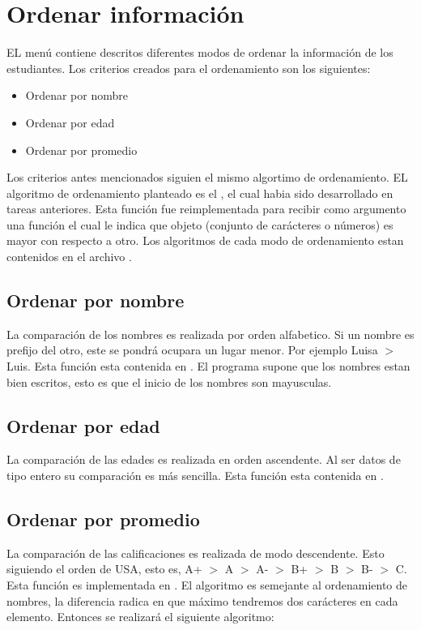 \section{Ordenar información}

EL menú contiene descritos diferentes modos de ordenar la información de los estudiantes. Los criterios creados para el ordenamiento son los siguientes:

\begin{itemize}
    \item Ordenar por nombre
    \item Ordenar por edad
    \item Ordenar por promedio
\end{itemize}

Los criterios antes mencionados siguien el mismo algortimo de ordenamiento. EL algoritmo de ordenamiento planteado es el , el cual habia sido desarrollado en tareas anteriores. Esta función fue reimplementada para recibir como argumento una función el cual le indica que objeto (conjunto de carácteres o números) es mayor con respecto a otro. Los algoritmos de cada modo de ordenamiento estan contenidos en el archivo .

\subsection{Ordenar por nombre}

La comparación de los nombres es realizada por orden alfabetico. Si un nombre es prefijo del otro, este se pondrá ocupara un lugar menor. Por ejemplo Luisa $>$ Luis. Esta función esta contenida en . El programa supone que los nombres estan bien escritos, esto es que el inicio de los nombres son mayusculas.

\subsection{Ordenar por edad}

La comparación de las edades es realizada en orden ascendente. Al ser datos de tipo entero su comparación es más sencilla. Esta función esta contenida en .

\subsection{Ordenar por promedio}

La comparación de las calificaciones es realizada de modo descendente. Esto siguiendo el orden de USA, esto es, A+ $>$ A $>$ A- $>$ B+ $>$ B $>$ B- $>$ C. Esta función es implementada en . El algoritmo es semejante al ordenamiento de nombres, la diferencia radica en que máximo tendremos dos carácteres en cada elemento. Entonces se realizará el siguiente algoritmo:

